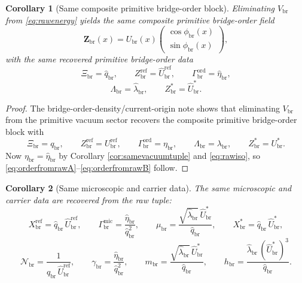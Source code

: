 \documentclass[11pt]{article}
\newcommand{\RespNorm}{\mathcal N_{\mathrm{br}}}
\newcommand{\RespFluxCoeff}{\gamma_{\mathrm{br}}}
\newcommand{\RespGap}{m_{\mathrm{br}}}
\newcommand{\RespBias}{h_{\mathrm{br}}}
\newcommand{\RespMicroRef}{X_{\mathrm{br}}^{\mathrm{ref}}}
\newcommand{\RespMicroFluxCoeff}{\Gamma_{\mathrm{br}}^{\mathrm{mic}}}
\newcommand{\RespMicroGap}{\mu_{\mathrm{br}}}
\newcommand{\RespMicroEq}{X_{\mathrm{br}}^{\ast}}
\newcommand{\RespOrderField}{\bm Z_{\mathrm{br}}}
\newcommand{\RespOrderReadout}{\Xi_{\mathrm{br}}}
\newcommand{\RespOrderRef}{Z_{\mathrm{br}}^{\mathrm{ref}}}
\newcommand{\RespOrderStiff}{\Gamma_{\mathrm{br}}^{\mathrm{ord}}}
\newcommand{\RespOrderQuartic}{\Lambda_{\mathrm{br}}}
\newcommand{\RespOrderEq}{Z_{\mathrm{br}}^{\ast}}
\newcommand{\RespVacAmp}{U_{\mathrm{br}}}
\newcommand{\RespVacRef}{U_{\mathrm{br}}^{\mathrm{ref}}}
\newcommand{\RespVacEq}{U_{\mathrm{br}}^{\ast}}
\newcommand{\RespVacPhase}{\phi_{\mathrm{br}}}
\newcommand{\RespVacCarrier}{V_{\mathrm{br}}}
\newcommand{\RespVacReadout}{q_{\mathrm{br}}}
\newcommand{\RespVacWell}{\lambda_{\mathrm{br}}}
\newcommand{\RespVacIso}{\eta_{\mathrm{br}}}
\newcommand{\RespRawReadout}{\widehat q_{\mathrm{br}}}
\newcommand{\RespRawRef}{\widehat U_{\mathrm{br}}^{\mathrm{ref}}}
\newcommand{\RespRawWell}{\widehat\lambda_{\mathrm{br}}}
\newcommand{\RespRawEq}{\widehat U_{\mathrm{br}}^{\ast}}
\newcommand{\RespRawIso}{\widehat\eta_{\mathrm{br}}}
\newtheorem{corollary}{Corollary}
\begin{document}
\begin{corollary}[Same composite primitive bridge-order block]
\label{cor:sameorderblock}
Eliminating \(\RespVacCarrier\) from \eqref{eq:rawenergy} yields the same composite primitive bridge-order field
\begin{equation}
\RespOrderField(x)
=
\RespVacAmp(x)
\begin{pmatrix}
\cos\RespVacPhase(x)\\
\sin\RespVacPhase(x)
\end{pmatrix},
\label{eq:raworderfield}
\end{equation}
with the same recovered primitive bridge-order data
\begin{equation}
\RespOrderReadout=\RespRawReadout,
\qquad
\RespOrderRef=\RespRawRef,
\qquad
\RespOrderStiff=\RespRawIso,
\label{eq:orderfromrawA}
\end{equation}
\begin{equation}
\RespOrderQuartic=\RespRawWell,
\qquad
\RespOrderEq=\RespRawEq.
\label{eq:orderfromrawB}
\end{equation}
\end{corollary}

\begin{proof}
The bridge-order-density/current-origin note shows that eliminating \(\RespVacCarrier\) from the primitive vacuum sector recovers the composite primitive bridge-order block with
\[
\RespOrderReadout=\RespVacReadout,
\qquad
\RespOrderRef=\RespVacRef,
\qquad
\RespOrderStiff=\RespVacIso,
\qquad
\RespOrderQuartic=\RespVacWell,
\qquad
\RespOrderEq=\RespVacEq.
\]
Now \(\RespVacIso=\RespRawIso\) by Corollary \ref{cor:samevacuumtuple} and \eqref{eq:rawiso}, so \eqref{eq:orderfromrawA}--\eqref{eq:orderfromrawB} follow.
\end{proof}

\begin{corollary}[Same microscopic and carrier data]
\label{cor:samemicroscopic}
The same microscopic and carrier data are recovered from the raw tuple:
\begin{equation}
\RespMicroRef=\RespRawReadout\,\RespRawRef,
\qquad
\RespMicroFluxCoeff=\frac{\RespRawIso}{\RespRawReadout^2},
\qquad
\RespMicroGap=\frac{\sqrt{\RespRawWell}\,\RespRawEq}{\RespRawReadout},
\qquad
\RespMicroEq=\RespRawReadout\,\RespRawEq,
\label{eq:microfromraw}
\end{equation}
\begin{equation}
\RespNorm=\frac{1}{\RespRawReadout\,\RespRawRef},
\qquad
\RespFluxCoeff=\frac{\RespRawIso}{\RespRawReadout^2},
\qquad
\RespGap=\frac{\sqrt{\RespRawWell}\,\RespRawEq}{\RespRawReadout},
\qquad
\RespBias=\frac{\RespRawWell\,(\RespRawEq)^3}{\RespRawReadout}.
\label{eq:carrierfromraw}
\end{equation}
\end{corollary}
\end{document}
